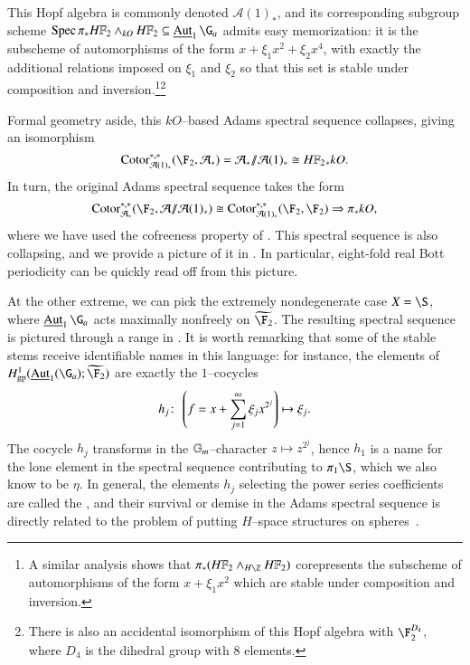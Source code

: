 \begin{example}
\begin{center}
\end{center}
This Hopf algebra is commonly denoted $\mathcal A(1)_*$, and its corresponding subgroup scheme $\Spec \pi_* \HFtwo \sm_{kO} \HFtwo \subseteq \InternalAut_1 \G_a$ admits easy memorization: it is the subscheme of automorphisms of the form $x + \xi_1 x^2 + \xi_2 x^4$, with exactly the additional relations imposed on $\xi_1$ and $\xi_2$ so that this set is stable under composition and inversion.\footnote{A similar analysis shows that $\pi_* (\HFtwo \wedge_{H\Z} \HFtwo)$ corepresents the subscheme of automorphisms of the form $x + \xi_1 x^2$ which are stable under composition and inversion.}\footnote{There is also an accidental isomorphism of this Hopf algebra with $\F_2^{D_4}$, where $D_4$ is the dihedral group with $8$ elements.}

Formal geometry aside, this $kO$--based Adams spectral sequence collapses, giving an isomorphism \[\Cotor^{*, *}_{\mathcal A(1)_*}(\F_2, \mathcal A_*) = \mathcal A_* \mmod \mathcal A(1)_* \cong \HFtwo_* kO.\]  In turn, the original Adams spectral sequence takes the form \[\Cotor^{*, *}_{\mathcal A_*}(\F_2, \mathcal A \mmod \mathcal A(1)_*) \cong \Cotor^{*, *}_{\mathcal A(1)_*}(\F_2, \F_2) \Rightarrow \pi_* kO,\] where we have used the cofreeness property of .  This spectral sequence is also collapsing, and we provide a picture of it in .  In particular, eight-fold real Bott periodicity can be quickly read off from this picture.
\end{example}

\begin{example}
At the other extreme, we can pick the extremely nondegenerate case $X = \S$, where $\InternalAut_1 \G_a$ acts maximally nonfreely on $\widetilde{\F_2}$.  The resulting spectral sequence is pictured through a range in .  It is worth remarking that some of the stable stems receive identifiable names in this language: for instance, the elements of $H^1_{\mathrm{gp}}(\InternalAut_1(\G_a); \widetilde{\F_2})$ are exactly the $1$--cocycles \[h_j\colon\thinspace \left( f = x + \sum_{j=1}^\infty \xi_j x^{2^j}\right) \mapsto \xi_j.\]  The cocycle $h_j$ transforms in the $\mathbb G_m$--character $z \mapsto z^{2^j}$, hence $h_1$ is a name for the lone element in the spectral sequence contributing to $\pi_1 \S$, which we also know to be $\eta$.  In general, the elements $h_j$ selecting the power series coefficients are called the , and their survival or demise in the Adams spectral sequence is directly related to the problem of putting $H$--space structures on spheres~\cite{AdamsVFoS}.
\end{example}

